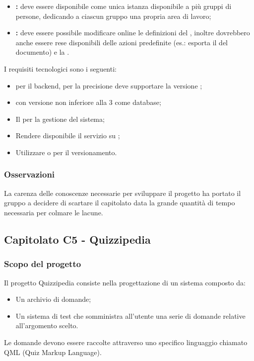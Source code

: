 \begin{itemize}
	\item \textbf{:} deve essere disponibile come unica istanza disponibile a più gruppi di persone, dedicando a ciascun gruppo una propria area di lavoro;
	\item \textbf{:} deve essere possibile modificare online le definizioni del , inoltre dovrebbero anche essere rese disponibili delle azioni predefinite (es.: esporta il  del documento)
	e la .
\end{itemize}

I  requisiti tecnologici sono i seguenti:
\begin{itemize}
	\item {} per il backend, per la precisione deve supportare la versione  ;
	\item {} con versione non inferiore alla 3 come database;
	\item Il  per la gestione del sistema;
	\item Rendere disponibile il servizio su ;
	\item Utilizzare  o  per il versionamento.
\end{itemize}

\subsubsection{Osservazioni}
La carenza delle conoscenze necessarie per sviluppare il progetto ha portato il gruppo a decidere di scartare il capitolato data la grande quantità
di tempo necessaria per colmare le lacune.


\subsection{Capitolato C5 - Quizzipedia}
\subsubsection{Scopo del progetto}

Il progetto Quizzipedia consiste nella progettazione di un sistema composto da:
\begin{itemize}
	\item Un archivio di domande;
	\item Un sistema di test che somministra all'utente una serie di domande relative all'argomento scelto.
\end{itemize}
Le domande devono essere raccolte attraverso uno specifico linguaggio chiamato QML (Quiz Markup Language).

